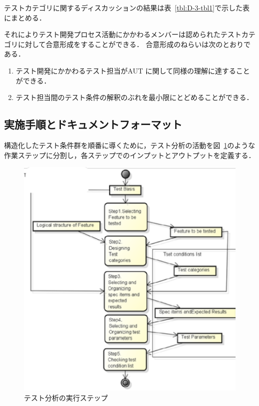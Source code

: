 テストカテゴリに関するディスカッションの結果は表~\ref{tbl:D-3-tbl1}で示した表にまとめる．

それによりテスト開発プロセス活動にかかわるメンバーは認められたテストカテゴリに対して合意形成をすることができる．
合意形成のねらいは次のとおりである．

\begin{enumerate}
\item テスト開発にかかわるテスト担当がAUT に関して同様の理解に達することができる．
\item テスト担当間のテスト条件の解釈のぶれを最小限にとどめることができる．
\end{enumerate}


\subsection{実施手順とドキュメントフォーマット}
構造化したテスト条件群を順番に導くために，テスト分析の活動を図~\ref{fig:D-4-Fig3}のような作業ステップに分割し，各ステップでのインプットとアウトプットを定義する．


\begin{figure}[htbp]
  \begin{center}
  \includegraphics[width=12cm]{./image/D-4-Fig3.png}
  \caption{テスト分析の実行ステップ}
  \label{fig:D-4-Fig3}
  \end{center}
   \end{figure}


